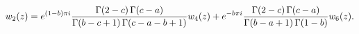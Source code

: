 \[w_{2}(z)=e^{(1-b)\pi i}\frac{\mathop{\Gamma\/}\nolimits\!\left(2-c\right)%
\mathop{\Gamma\/}\nolimits\!\left(c-a\right)}{\mathop{\Gamma\/}\nolimits\!%
\left(b-c+1\right)\mathop{\Gamma\/}\nolimits\!\left(c-a-b+1\right)}w_{4}(z)+e^%
{-b\pi i}\frac{\mathop{\Gamma\/}\nolimits\!\left(2-c\right)\mathop{\Gamma\/}%
\nolimits\!\left(c-a\right)}{\mathop{\Gamma\/}\nolimits\!\left(b-a+1\right)%
\mathop{\Gamma\/}\nolimits\!\left(1-b\right)}w_{6}(z).\]